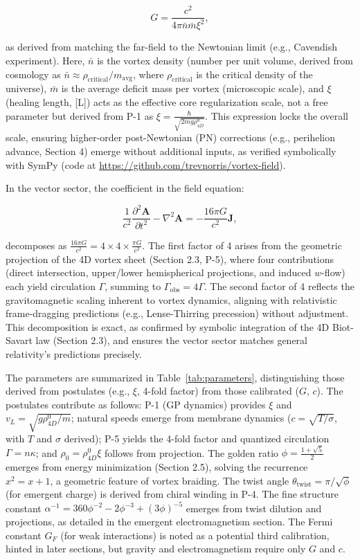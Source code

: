 \[
G = \frac{c^2}{4\pi \bar{n} \bar{m} \xi^2},
\]

as derived from matching the far-field to the Newtonian limit (e.g., Cavendish experiment). Here, $\bar{n}$ is the vortex density (number per unit volume, derived from cosmology as $\bar{n} \approx \rho_{\text{critical}} / m_{\text{avg}}$, where $\rho_{\text{critical}}$ is the critical density of the universe), $\bar{m}$ is the average deficit mass per vortex (microscopic scale), and $\xi$ (healing length, [L]) acts as the effective core regularization scale, not a free parameter but derived from P-1 as $\xi = \frac{\hbar}{\sqrt{2 m g \rho_{4D}^0}}$. This expression locks the overall scale, ensuring higher-order post-Newtonian (PN) corrections (e.g., perihelion advance, Section 4) emerge without additional inputs, as verified symbolically with SymPy (code at \url{https://github.com/trevnorris/vortex-field}).

In the vector sector, the coefficient in the field equation:

\[
\frac{1}{c^2} \frac{\partial^2 \mathbf{A}}{\partial t^2} - \nabla^2 \mathbf{A} = -\frac{16\pi G}{c^2} \mathbf{J},
\]

decomposes as $\frac{16\pi G}{c^2} = 4 \times 4 \times \frac{\pi G}{c^2}$. The first factor of 4 arises from the geometric projection of the 4D vortex sheet (Section 2.3, P-5), where four contributions (direct intersection, upper/lower hemispherical projections, and induced $w$-flow) each yield circulation $\Gamma$, summing to $\Gamma_{\text{obs}} = 4\Gamma$. The second factor of 4 reflects the gravitomagnetic scaling inherent to vortex dynamics, aligning with relativistic frame-dragging predictions (e.g., Lense-Thirring precession) without adjustment. This decomposition is exact, as confirmed by symbolic integration of the 4D Biot-Savart law (Section 2.3), and ensures the vector sector matches general relativity's predictions precisely.

The parameters are summarized in Table~\ref{tab:parameters}, distinguishing those derived from postulates (e.g., $\xi$, 4-fold factor) from those calibrated ($G$, $c$). The postulates contribute as follows: P-1 (GP dynamics) provides $\xi$ and $v_L = \sqrt{g \rho_{4D}^0 / m}$; natural speeds emerge from membrane dynamics ($c = \sqrt{T / \sigma}$, with $T$ and $\sigma$ derived); P-5 yields the 4-fold factor and quantized circulation $\Gamma = n \kappa$; and $\rho_0 = \rho_{4D}^0 \xi$ follows from projection. The golden ratio $\phi = \frac{1 + \sqrt{5}}{2}$ emerges from energy minimization (Section 2.5), solving the recurrence $x^2 = x + 1$, a geometric feature of vortex braiding. The twist angle $\theta_{\text{twist}} = \pi / \sqrt{\phi}$ (for emergent charge) is derived from chiral winding in P-4. The fine structure constant $\alpha^{-1} = 360 \phi^{-2} - 2 \phi^{-3} + (3 \phi)^{-5}$ emerges from twist dilution and projections, as detailed in the emergent electromagnetism section. The Fermi constant $G_F$ (for weak interactions) is noted as a potential third calibration, hinted in later sections, but gravity and electromagnetism require only $G$ and $c$.


